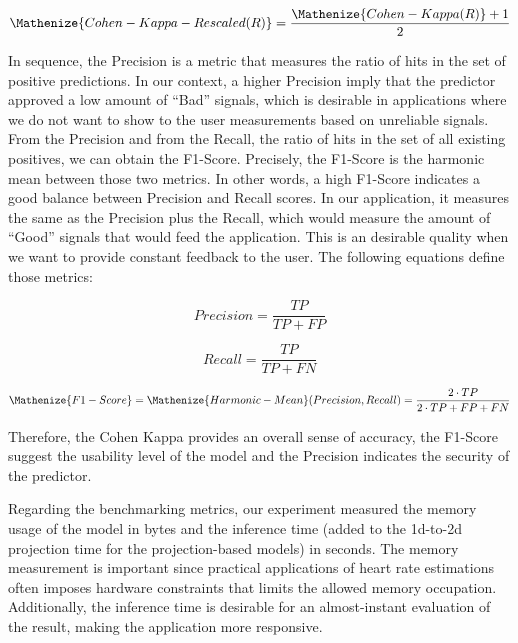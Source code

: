 \begin{equation}
\Mathenize{Cohen-Kappa-Rescaled(R)} = \frac{\Mathenize{Cohen-Kappa(R)}+1}{2} 
\end{equation}  

In sequence, the Precision is a metric that measures the ratio of hits in the set of positive predictions. In our context, a higher Precision imply that the predictor approved a low amount of ``Bad'' signals, which is desirable in applications where we do not want to show to the user measurements based on unreliable signals. From the Precision and from the Recall, the ratio of hits in the set of all existing positives, we can obtain the F1-Score. Precisely, the F1-Score is the harmonic mean between those two metrics. In other words, a high F1-Score indicates a good balance between Precision and Recall scores. In our application, it measures the same as the Precision plus the Recall, which would measure the amount of ``Good'' signals that would feed the application. This is an desirable quality when we want to provide constant feedback to the user. The following equations define those metrics:

\begin{equation} \label{eq:Precision}
Precision = \frac{TP}{TP+FP}
\end{equation}


\begin{equation} \label{eq:Recall}
Recall = \frac{TP}{TP+FN}
\end{equation}

\begin{equation} \label{eq:F1-Score}
\Mathenize{F1-Score}  = \Mathenize{Harmonic-Mean}(Precision,Recall) = \frac{2 \cdot TP}{2 \cdot TP + FP + FN}
\end{equation}

\noindent Therefore, the Cohen Kappa provides an overall sense of accuracy, the F1-Score suggest the usability level of the model and the Precision indicates the security of the predictor. 

Regarding the benchmarking metrics, our experiment measured the memory usage of the model in bytes and the inference time (added to the 1d-to-2d projection time for the projection-based models) in seconds. The memory measurement is important since practical applications of heart rate estimations often imposes hardware constraints that limits the allowed memory occupation. Additionally, the inference time is desirable for an almost-instant evaluation of the result, making the application more responsive.

